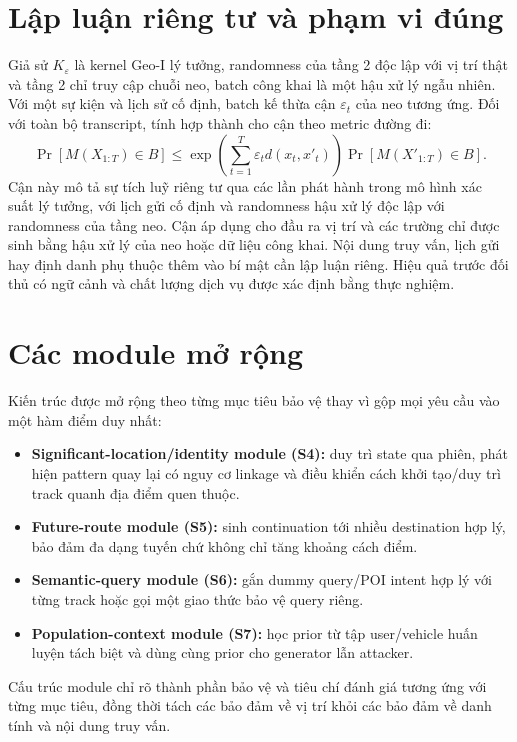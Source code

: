 \documentclass[12pt,a4paper,oneside]{report}
\begin{document}
\section{Lập luận riêng tư và phạm vi đúng}

Giả sử $K_{\varepsilon}$ là kernel Geo-I lý tưởng, randomness của tầng 2 độc lập với vị trí thật và tầng 2 chỉ truy cập chuỗi neo, batch công khai là một hậu xử lý ngẫu nhiên. Với một sự kiện và lịch sử cố định, batch kế thừa cận $\varepsilon_t$ của neo tương ứng. Đối với toàn bộ transcript, tính hợp thành cho cận theo metric đường đi:
\[
\Pr[M(X_{1:T})\in B]
\leq \exp\!\left(\sum_{t=1}^{T}\varepsilon_t d(x_t,x'_t)\right)
\Pr[M(X'_{1:T})\in B].
\]
Cận này mô tả sự tích luỹ riêng tư qua các lần phát hành trong mô hình xác suất lý tưởng, với lịch gửi cố định và randomness hậu xử lý độc lập với randomness của tầng neo. Cận áp dụng cho đầu ra vị trí và các trường chỉ được sinh bằng hậu xử lý của neo hoặc dữ liệu công khai. Nội dung truy vấn, lịch gửi hay định danh phụ thuộc thêm vào bí mật cần lập luận riêng. Hiệu quả trước đối thủ có ngữ cảnh và chất lượng dịch vụ được xác định bằng thực nghiệm.

\section{Các module mở rộng}

Kiến trúc được mở rộng theo từng mục tiêu bảo vệ thay vì gộp mọi yêu cầu vào một hàm điểm duy nhất:

\begin{itemize}
  \item \textbf{Significant-location/identity module (S4):} duy trì state qua phiên, phát hiện pattern quay lại có nguy cơ linkage và điều khiển cách khởi tạo/duy trì track quanh địa điểm quen thuộc.
  \item \textbf{Future-route module (S5):} sinh continuation tới nhiều destination hợp lý, bảo đảm đa dạng tuyến chứ không chỉ tăng khoảng cách điểm.
  \item \textbf{Semantic-query module (S6):} gắn dummy query/POI intent hợp lý với từng track hoặc gọi một giao thức bảo vệ query riêng.
  \item \textbf{Population-context module (S7):} học prior từ tập user/vehicle huấn luyện tách biệt và dùng cùng prior cho generator lẫn attacker.
\end{itemize}

Cấu trúc module chỉ rõ thành phần bảo vệ và tiêu chí đánh giá tương ứng với từng mục tiêu, đồng thời tách các bảo đảm về vị trí khỏi các bảo đảm về danh tính và nội dung truy vấn.
\end{document}
